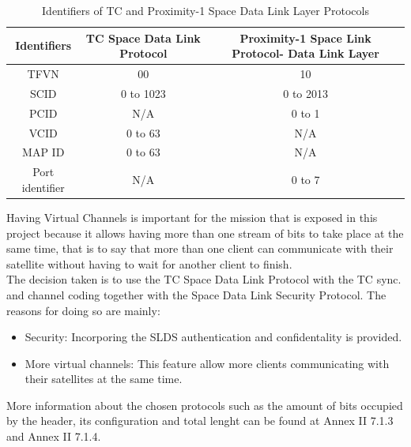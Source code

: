 \begin{table}[H]
\begin{center}
\begin{tabular}{|c|c|c|}
\hline
Identifiers&TC Space Data Link Protocol&Proximity-1 Space Link Protocol- Data Link Layer\\
\hline
TFVN&00&10\\
\hline
SCID&0 to 1023&0 to 2013\\
\hline
PCID&N/A&0 to 1\\
\hline
VCID&0 to 63&N/A\\
\hline
MAP ID&0 to 63&N/A\\
\hline
Port identifier&N/A&0 to 7\\
\hline
\end{tabular}
\caption{Identifiers of TC and Proximity-1 Space Data Link Layer Protocols}
\end{center}
\end{table} 
Having Virtual Channels is important for the mission that is exposed in this project because it allows having more than one stream of bits to take place at the same time, that is to say that more than one client can communicate with their satellite without having to wait for another client to finish.\\
The decision taken is to use the TC Space Data Link Protocol with the TC sync. and channel coding together with the Space Data Link Security Protocol. The reasons for doing so are mainly:
\begin{itemize}
\item Security: Incorporing the SLDS authentication and confidentality is provided.
\item More virtual channels: This feature allow more clients communicating with their satellites at the same time.
\end{itemize}
More information about the chosen protocols such as the amount of bits occupied by the header, its configuration and total lenght can be found at Annex II 7.1.3 and Annex II 7.1.4.

%
% 
%